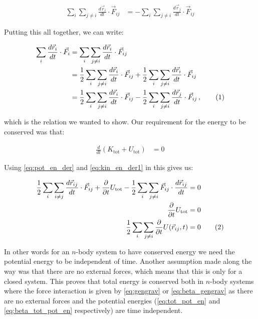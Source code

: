 \documentclass[reprint,english,notitlepage]{revtex4-1}  %
\newcommand\numberthis{\addtocounter{equation}{1}\tag{\theequation}}
\begin{document}
\begin{align*}
\sum\limits_i \sum\limits_{j \neq i} \frac{d\vec{r}_i}{dt} \cdot \vec{F}_{ij} &= -\sum\limits_i \sum\limits_{j \neq i} \frac{d\vec{r}_j}{dt} \cdot \vec{F}_{ij}
\end{align*}

Putting this all together, we can write:

\begin{align*}
\sum\limits_i \frac{d\vec{r}_i}{dt} \cdot \vec{F}_i &= \sum\limits_i \sum\limits_{j \neq i} \frac{d\vec{r}_i}{dt} \cdot \vec{F}_{ij} \\
&= \frac{1}{2} \sum\limits_i \sum\limits_{j \neq i} \frac{d\vec{r}_i}{dt} \cdot \vec{F}_{ij} + \frac{1}{2} \sum\limits_i \sum\limits_{j \neq i} \frac{d\vec{r}_i}{dt} \cdot \vec{F}_{ij} \\
&= \frac{1}{2} \sum\limits_i \sum\limits_{j \neq i} \frac{d\vec{r}_i}{dt} \cdot \vec{F}_{ij} - \frac{1}{2} \sum\limits_i \sum\limits_{j \neq i} \frac{d\vec{r}_j}{dt} \cdot \vec{F}_{ij} \, , \numberthis \label{eq:pos_force_dot_sum}
\end{align*}

which is the relation we wanted to show. Our requirement for the energy to be conserved was that:

\begin{align*}
\frac{d}{dt}(K_\text{tot} + U_\text{tot}) &= 0
\end{align*}

Using \eqref{eq:pot_en_der} and \eqref{eq:kin_en_der1} in this gives us:

\begin{align*}
\frac{1}{2}\sum\limits_i \sum\limits_{i\neq j} \frac{d\vec{r}_{ij}}{dt} \cdot \vec{F}_{ij} + \frac{\partial}{\partial t} U_\text{tot} - \frac{1}{2}\sum\limits_{i} \sum\limits_{j\neq i} \vec{F}_{ij} \cdot \frac{d\vec{r}_{ij}}{dt} &= 0 \\
\frac{\partial}{\partial t} U_\text{tot} &= 0 \\
\frac{1}{2}\sum\limits_i \sum\limits_{j\neq i } \frac{\partial}{\partial t} U(\vec{r}_{ij},t) &= 0 \numberthis \label{eq:energy_cons}
\end{align*}

In other words for an $n$-body system to have conserved energy we need the potential energy to be independent of time. Another assumption made along the way was that there are no external forces, which means that this is only for a closed system. This proves that total energy is conserved both in $n$-body systems where the force interaction is given by \eqref{eq:gengrav} or \eqref{eq:beta_gengrav} as there are no external forces and the potential energies (\eqref{eq:tot_pot_en} and \eqref{eq:beta_tot_pot_en} respectively) are time independent.
\end{document}

